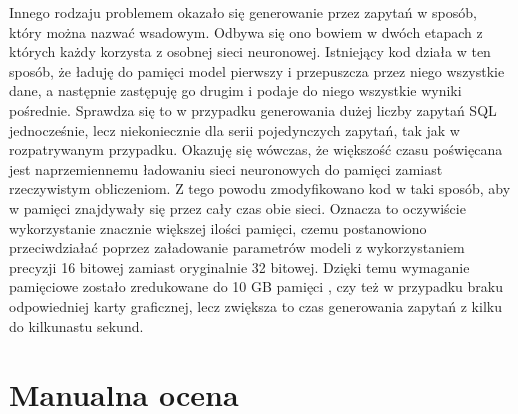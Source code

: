 Innego rodzaju problemem okazało się generowanie przez  zapytań w sposób, który można nazwać wsadowym. Odbywa się ono bowiem w dwóch etapach z których każdy korzysta z osobnej sieci neuronowej. Istniejący kod działa w ten sposób, że ładuję do pamięci model pierwszy i przepuszcza przez niego wszystkie dane, a następnie zastępuję go drugim i podaje do niego wszystkie wyniki pośrednie. Sprawdza się to w przypadku generowania dużej liczby zapytań SQL jednocześnie, lecz niekoniecznie dla serii pojedynczych zapytań, tak jak w rozpatrywanym przypadku. Okazuję się wówczas, że większość czasu poświęcana jest naprzemiennemu ładowaniu sieci neuronowych do pamięci zamiast rzeczywistym obliczeniom. Z tego powodu zmodyfikowano kod w taki sposób, aby w pamięci znajdywały się przez cały czas obie sieci. Oznacza to oczywiście wykorzystanie znacznie większej ilości pamięci, czemu postanowiono przeciwdziałać poprzez załadowanie parametrów modeli z wykorzystaniem precyzji 16 bitowej zamiast oryginalnie 32 bitowej. Dzięki temu wymaganie pamięciowe zostało zredukowane do 10 GB pamięci , czy też  w przypadku braku odpowiedniej karty graficznej, lecz zwiększa to czas generowania zapytań z kilku do kilkunastu sekund.

\section{Manualna ocena}
\lipsum[1-3]
